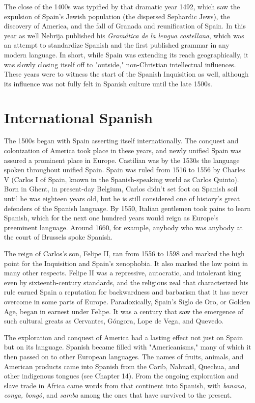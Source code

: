 The close of the 1400s was typified by that dramatic year
1492, which saw the expulsion of Spain's Jewish population (the dispersed Sephardic Jews), the discovery of America, and the fall of Granada and reunification of Spain. In this year as well Nebrija published
his \emph{Gramática de la lengua castellana}, which was an attempt to standardize Spanish and the first published grammar in any modern language. In short, while Spain was extending its reach geographically, it
was slowly closing itself off to "outside," non-Christian intellectual influences. These years were to witness the start of the Spanish Inquisition as well, although its influence was not fully felt in Spanish culture until the late 1500s.

\section{International Spanish}

The 1500s began with Spain asserting itself internationally.
The conquest and colonization of America took place in these years,
and newly unified Spain was assured a prominent place in Europe.
Castilian was by the 1530s the language spoken throughout unified
Spain. Spain was ruled from 1516 to 1556 by Charles V (Carlos I of
Spain, known in the Spanish-speaking world as Carlos Quinto). Born
in Ghent, in present-day Belgium, Carlos didn't set foot on Spanish
soil until he was eighteen years old, but he is still considered one of
history's great defenders of the Spanish language. By 1550, Italian gentlemen took pains to learn Spanish, which for the next one hundred
years would reign as Europe's preeminent language. Around 1660, for
example, anybody who was anybody at the court of Brussels spoke
Spanish.

The reign of Carlos's son, Felipe II, ran from 1556 to 1598 and
marked the high point for the Inquisition and Spain's xenophobia. It
also marked the low point in many other respects. Felipe II was a repressive, autocratic, and intolerant king even by sixteenth-century
standards, and the religious zeal that characterized his rule earned
Spain a reputation for backwardness and barbarism that it has never
overcome in some parts of Europe. Paradoxically, Spain's Siglo de Oro,
or Golden Age, began in earnest under Felipe. It was a century that saw
the emergence of such cultural greats as Cervantes, Góngora, Lope de
Vega, and Quevedo.

The exploration and conquest of America had a lasting effect
not just on Spain but on its language. Spanish became filled with
"Americanisms," many of which it then passed on to other European
languages. The names of fruits, animals, and American products came
into Spanish from the Carib, Nahuatl, Quechua, and other indigenous
tongues (see Chapter 14). From the ongoing exploration and slave trade
in Africa came words from that continent into Spanish, with \emph{banana,
conga, bongó}, and \emph{samba} among the ones that have survived to the
present.

